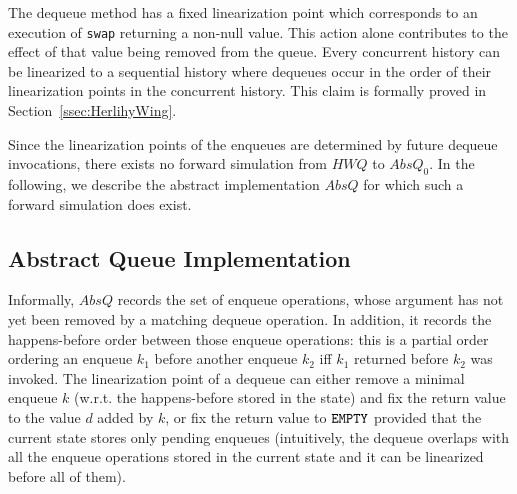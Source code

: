 The dequeue method has a fixed linearization point which corresponds to an execution of {\tt swap} returning a non-null value. This action alone contributes to the effect of that value being removed from the queue. Every concurrent history can be linearized to a sequential history where dequeues occur in the order of their linearization points in the concurrent history.
This claim is formally proved in Section~\ref{ssec:HerlihyWing}.

Since the linearization points of the enqueues are determined by future dequeue invocations, there exists no forward simulation from $\mathit{HWQ}$ to $AbsQ_0$.
In the following, we describe the abstract implementation $AbsQ$ for which such a forward simulation does exist.

\vspace{-3.5mm}
\subsection{Abstract Queue Implementation}
\vspace{-1.5mm}

Informally, $AbsQ$ records the set of enqueue operations, whose argument has not yet been removed by a matching dequeue operation. In addition, it records the happens-before order between those enqueue operations: this is a partial order ordering an enqueue $k_1$ before another enqueue $k_2$ iff $k_1$ returned before $k_2$ was invoked.
The linearization point of a dequeue can either remove a minimal enqueue $k$ (w.r.t. the happens-before stored in the state) and fix the return value to the value $d$ added by $k$, or fix the return value to ${\tt EMPTY}$ provided that the current state stores only pending enqueues (intuitively, the dequeue overlaps with all the enqueue operations stored in the current state and it can be linearized before all of them).

